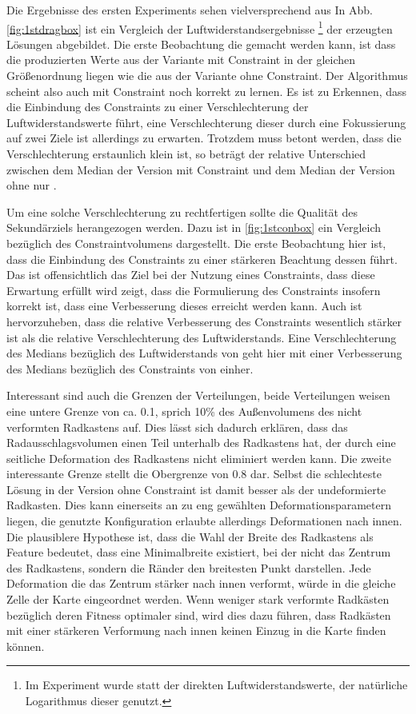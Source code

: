 Die Ergebnisse des ersten Experiments sehen vielversprechend aus In Abb. \cref{fig:1stdragbox} ist ein Vergleich der Luftwiderstandsergebnisse 
\footnote{Im Experiment wurde statt der direkten Luftwiderstandswerte, der natürliche Logarithmus dieser genutzt.} 
der erzeugten Lösungen abgebildet.
Die erste Beobachtung die gemacht werden kann, ist dass die produzierten Werte aus der Variante mit Constraint in der gleichen Größenordnung liegen wie die aus der Variante ohne Constraint.
Der Algorithmus scheint also auch mit Constraint noch korrekt zu lernen.
Es ist zu Erkennen, dass die Einbindung des Constraints zu einer Verschlechterung der Luftwiderstandswerte führt, eine Verschlechterung dieser durch eine Fokussierung auf zwei Ziele ist allerdings zu erwarten.
Trotzdem muss betont werden, dass die Verschlechterung erstaunlich klein ist, so beträgt der relative Unterschied zwischen dem Median der Version mit Constraint und dem Median der Version ohne nur .

Um eine solche Verschlechterung zu rechtfertigen sollte die Qualität des Sekundärziels herangezogen werden.
Dazu ist in \cref{fig:1stconbox} ein Vergleich bezüglich des Constraintvolumens dargestellt.
Die erste Beobachtung hier ist, dass die Einbindung des Constraints zu einer stärkeren Beachtung dessen führt.
Das ist offensichtlich das Ziel bei der Nutzung eines Constraints, dass diese Erwartung erfüllt wird zeigt, dass die Formulierung des Constraints insofern korrekt ist, dass eine Verbesserung dieses erreicht werden kann.
Auch ist hervorzuheben, dass die relative Verbesserung des Constraints wesentlich stärker ist als die relative Verschlechterung des Luftwiderstands.
Eine Verschlechterung des Medians bezüglich des Luftwiderstands von  geht hier mit einer Verbesserung des Medians bezüglich des Constraints von  einher.

Interessant sind auch die Grenzen der Verteilungen, beide Verteilungen weisen eine untere Grenze von ca. 0.1, sprich 10\% des Außenvolumens des nicht verformten Radkastens auf.
Dies lässt sich dadurch erklären, dass das Radausschlagsvolumen einen Teil unterhalb des Radkastens hat, der durch eine seitliche Deformation des Radkastens nicht eliminiert werden kann.
Die zweite interessante Grenze stellt die Obergrenze von 0.8 dar.
Selbst die schlechteste Lösung in der Version ohne Constraint ist damit besser als der undeformierte Radkasten.
Dies kann einerseits an zu eng gewählten Deformationsparametern liegen, die genutzte Konfiguration erlaubte allerdings Deformationen nach innen.
Die plausiblere Hypothese ist, dass die Wahl der Breite des Radkastens als Feature bedeutet, dass eine Minimalbreite existiert, bei der nicht das Zentrum des Radkastens, sondern die Ränder den breitesten Punkt darstellen.
Jede Deformation die das Zentrum stärker nach innen verformt, würde in die gleiche Zelle der Karte eingeordnet werden.
Wenn weniger stark verformte Radkästen bezüglich deren Fitness optimaler sind, wird dies dazu führen, dass Radkästen mit einer stärkeren Verformung nach innen keinen Einzug in die Karte finden können.

